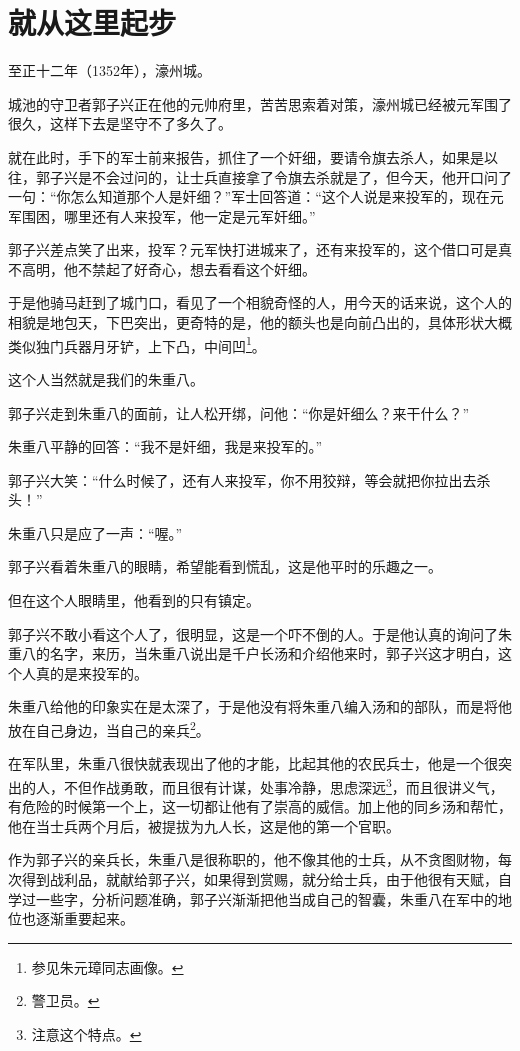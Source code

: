 \section{就从这里起步}
\ifnum{}
	\begin{multicols}{\theparacolNo}
		\fi
		至正十二年（1352年），濠州城。

		城池的守卫者郭子兴正在他的元帅府里，苦苦思索着对策，濠州城已经被元军围了很久，这样下去是坚守不了多久了。

		就在此时，手下的军士前来报告，抓住了一个奸细，要请令旗去杀人，如果是以往，郭子兴是不会过问的，让士兵直接拿了令旗去杀就是了，但今天，他开口问了一句：“你怎么知道那个人是奸细？”军士回答道：“这个人说是来投军的，现在元军围困，哪里还有人来投军，他一定是元军奸细。”

		郭子兴差点笑了出来，投军？元军快打进城来了，还有来投军的，这个借口可是真不高明，他不禁起了好奇心，想去看看这个奸细。

		于是他骑马赶到了城门口，看见了一个相貌奇怪的人，用今天的话来说，这个人的相貌是地包天，下巴突出，更奇特的是，他的额头也是向前凸出的，具体形状大概类似独门兵器月牙铲，上下凸，中间凹\footnote{参见朱元璋同志画像。}。

		这个人当然就是我们的朱重八。

		郭子兴走到朱重八的面前，让人松开绑，问他：“你是奸细么？来干什么？”

		朱重八平静的回答：“我不是奸细，我是来投军的。”

		郭子兴大笑：“什么时候了，还有人来投军，你不用狡辩，等会就把你拉出去杀头！”

		朱重八只是应了一声：“喔。”

		郭子兴看着朱重八的眼睛，希望能看到慌乱，这是他平时的乐趣之一。

		但在这个人眼睛里，他看到的只有镇定。

		郭子兴不敢小看这个人了，很明显，这是一个吓不倒的人。于是他认真的询问了朱重八的名字，来历，当朱重八说出是千户长汤和介绍他来时，郭子兴这才明白，这个人真的是来投军的。

		朱重八给他的印象实在是太深了，于是他没有将朱重八编入汤和的部队，而是将他放在自己身边，当自己的亲兵\footnote{警卫员。}。

		在军队里，朱重八很快就表现出了他的才能，比起其他的农民兵士，他是一个很突出的人，不但作战勇敢，而且很有计谋，处事冷静，思虑深远\footnote{注意这个特点。}，而且很讲义气，有危险的时候第一个上，这一切都让他有了崇高的威信。加上他的同乡汤和帮忙，他在当士兵两个月后，被提拔为九人长，这是他的第一个官职。

		作为郭子兴的亲兵长，朱重八是很称职的，他不像其他的士兵，从不贪图财物，每次得到战利品，就献给郭子兴，如果得到赏赐，就分给士兵，由于他很有天赋，自学过一些字，分析问题准确，郭子兴渐渐把他当成自己的智囊，朱重八在军中的地位也逐渐重要起来。


\end{multicols}
